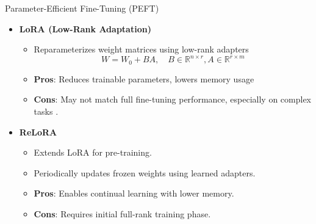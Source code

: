 \documentclass{beamer}
\begin{document}
\begin{frame}{Parameter-Efficient Fine-Tuning (PEFT)}
    \begin{itemize}
        \item \textbf{LoRA (Low-Rank Adaptation)} \citep{huLoRALowRankAdaptation2021}
            \begin{itemize}
                \item Reparameterizes weight matrices using low-rank adapters
                \begin{equation}
                    W = W_0 + BA, \quad B \in \mathbb{R}^{n \times r}, A \in \mathbb{R}^{r \times m}
                \end{equation}
                \item \textbf{Pros}: Reduces trainable parameters, lowers memory usage
                \item \textbf{Cons}: May not match full fine-tuning performance, especially on complex tasks \citep{xiaChainLoRAEfficient2024}.
            \end{itemize}
        \vspace{0.5em}
        \item \textbf{ReLoRA} \citep{lialinReLoRAHighRankTraining2023}
            \begin{itemize}
                \item Extends LoRA for pre-training.
                \item Periodically updates frozen weights using learned adapters.
                \item \textbf{Pros}: Enables continual learning with lower memory.
                \item \textbf{Cons}: Requires initial full-rank training phase.
            \end{itemize}
    \end{itemize}
\end{frame}
\end{document}
